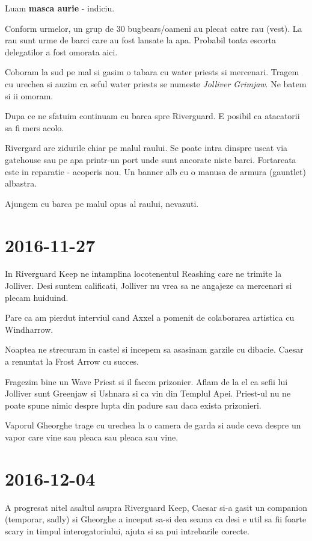 \documentclass[12pt,oneside]{book}
\begin{document}
Luam \textbf{masca aurie} - indiciu.

Conform urmelor, un grup de 30 bugbears/oameni au plecat catre rau (vest). 
La rau sunt  urme de barci care au fost lansate la apa. Probabil toata escorta 
delegatilor a fost omorata aici.

Coboram la sud pe mal si gasim o tabara cu water priests si mercenari. Tragem
cu urechea si auzim ca seful water priests se numeste \textit{Jolliver Grimjaw}.
Ne batem si ii omoram.

Dupa ce ne sfatuim continuam cu barca spre Riverguard. E posibil ca atacatorii sa
fi mers acolo.

Rivergard are zidurile chiar pe malul raului. Se poate intra dinspre uscat via 
gatehouse sau pe apa printr-un port unde sunt ancorate niste barci.
Fortareata este in reparatie - acoperis nou. Un banner alb cu o manusa de 
armura (gauntlet) albastra.

Ajungem cu barca pe malul opus al raului, nevazuti. 

\section{2016-11-27}


In Riverguard Keep ne intamplina locotenentul Reashing care ne trimite la Jolliver.
Desi suntem calificati, Jolliver nu vrea sa ne angajeze ca mercenari si 
plecam  huiduind. 

Pare ca am pierdut interviul cand Axxel a pomenit de colaborarea 
artistica cu Windharrow.

Noaptea ne strecuram in  castel si incepem sa asasinam garzile cu dibacie. Caesar 
a renuntat la Frost Arrow cu succes.

Fragezim bine un Wave Priest si il facem prizonier. Aflam de la el ca sefii lui Jolliver sunt Greenjaw si Ushnara si ca vin din Templul Apei. Priest-ul nu ne poate spune nimic despre lupta din padure sau daca exista prizonieri.

\begin{rpg-paperbox}{Vaporul}
Gheorghe trage cu urechea la o camera de garda si aude ceva despre un vapor care
vine sau pleaca sau pleaca sau vine.
\end{rpg-paperbox}

\section{2016-12-04}

A progresat nitel asaltul asupra Riverguard Keep, Caesar si-a gasit un companion 
(temporar, sadly) si Gheorghe a inceput sa-si dea seama ca desi e util sa fii 
foarte scary in timpul interogatoriului, ajuta si sa pui intrebarile corecte.
\end{document}
